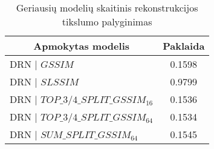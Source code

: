 \begin{table}[]
\centering
\begin{tabular}{@{}p{6.25cm}c@{}}
\toprule
\multicolumn{1}{c}{\textbf{Apmokytas modelis}} & \multicolumn{1}{c}{\textbf{Paklaida}} \\ \midrule
DRN | $GSSIM$ & 0.1598 \\ \cmidrule(r){1-1}
DRN | $SLSSIM$ & 0.9799 \\ \cmidrule(r){1-1}
DRN | $TOP\_3/4\_SPLIT\_GSSIM_{16}$ & 0.1536 \\ \cmidrule(r){1-1}
DRN | $TOP\_3/4\_SPLIT\_GSSIM_{64}$ & 0.1534 \\ \cmidrule(r){1-1}
DRN | $SUM\_SPLIT\_GSSIM_{64}$ & 0.1545 %
\\ \bottomrule
\end{tabular}

\caption{Geriausių modelių skaitinis rekonstrukcijos tikslumo palyginimas}
\label{tab:new-metrics-table}
\end{table}